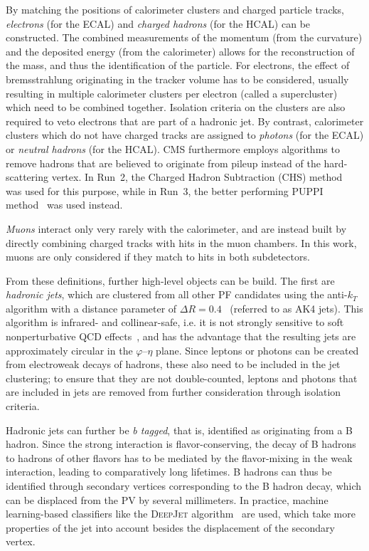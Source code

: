 By matching the positions of calorimeter clusters and charged particle tracks, \textit{electrons} (for the ECAL) and \textit{charged hadrons} (for the HCAL) can be constructed. The combined measurements of the momentum (from the curvature) and the deposited energy (from the calorimeter) allows for the reconstruction of the mass, and thus the identification of the particle.
For electrons, the effect of bremsstrahlung originating in the tracker volume has to be considered, usually resulting in multiple calorimeter clusters per electron (called a supercluster) which need to be combined together. Isolation criteria on the clusters are also required to veto electrons that are part of a hadronic jet. 
By contrast, calorimeter clusters which do not have charged tracks are assigned to \textit{photons} (for the ECAL) or \textit{neutral hadrons} (for the HCAL). 
CMS furthermore employs algorithms to remove hadrons that are believed to originate from pileup instead of the hard-scattering vertex. In Run~2, the Charged Hadron Subtraction (CHS) method~\cite{CMS:PRF-14-001} was used for this purpose, while in Run~3, the better performing PUPPI method~\cite{Bertolini:2014bba,CMS:2020ebo} was used instead.

\textit{Muons} interact only very rarely with the calorimeter, and are instead built by directly combining charged tracks with hits in the muon chambers. In this work, muons are only considered if they match to hits in both subdetectors.

From these definitions, further high-level objects can be build. The first are \textit{hadronic jets}, which are clustered from all other PF candidates using the anti-$k_T$ algorithm with a distance parameter of $\Delta R = 0.4$~\cite{Cacciari:2008gp} (referred to as AK4 jets). This algorithm is infrared- and collinear-safe, i.e. it is not strongly sensitive to soft nonperturbative QCD effects~\cite{Skands:2012ts}, and has the advantage that the resulting jets are approximately circular in the $\varphi$--$\eta$ plane. Since leptons or photons can be created from electroweak decays of hadrons, these also need to be included in the jet clustering; to ensure that they are not double-counted, leptons and photons that are included in jets are removed from further consideration through isolation criteria.

Hadronic jets can further be \textit{b tagged}, that is, identified as originating from a B hadron. Since the strong interaction is flavor-conserving, the decay of B hadrons to hadrons of other flavors has to be mediated by the flavor-mixing in the weak interaction, leading to comparatively long lifetimes. B hadrons can thus be identified through secondary vertices corresponding to the B hadron decay, which can be displaced from the PV by several millimeters. In practice, machine learning-based classifiers like the \textsc{DeepJet} algorithm~\cite{DeepJet:2020} are used, which take more properties of the jet into account besides the displacement of the secondary vertex.

